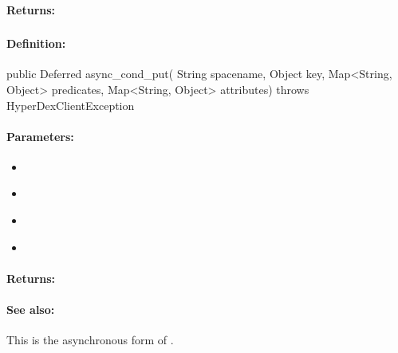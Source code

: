 \paragraph{Returns:}


\pagebreak
\subsubsection{}
\label{api:java:async_cond_put}


\paragraph{Definition:}
\begin{javacode}
public Deferred async_cond_put(
        String spacename,
        Object key,
        Map<String, Object> predicates,
        Map<String, Object> attributes) throws HyperDexClientException
\end{javacode}

\paragraph{Parameters:}
\begin{itemize}[noitemsep]
\item {}\\

\item {}\\

\item {}\\

\item {}\\

\end{itemize}

\paragraph{Returns:}


\paragraph{See also:}  This is the asynchronous form of .

